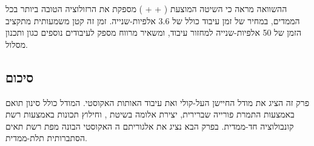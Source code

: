 ההשוואה מראה כי השיטה המוצעת ( +  + ) מספקת את הרזולוציה הטובה ביותר בכל הממדים, במחיר של זמן עיבוד כולל של 3.6 אלפיות-שנייה. זמן זה קטן משמעותית מתקציב הזמן של 50 אלפיות-שנייה למחזור עיבוד, ומשאיר מרווח מספק לעיבודים נוספים כגון  ותכנון מסלול. \cite{CrewAIDocs}

\subsection{סיכום}
\label{sec:ch03_summary}

פרק זה הציג את מודל החיישן העל-קולי ואת עיבוד האותות האקוסטי. המודל כולל סינון תואם באמצעות התמרת פורייה שברירית, יצירת אלומה בשיטת , וחילוץ תכונות באמצעות רשת קונבולוציה חד-ממדית. בפרק הבא נציג את אלגוריתם ה האקוסטי הבונה מפת רשת תאים הסתברותית תלת-ממדית. \cite{Rihaczek1969MatchedFilter} \cite{CrewAIDocs}

